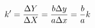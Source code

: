 \documentclass[preview]{standalone}
\begin{document}
\begin{align*}
\special{dvisvgm:raw <g id='unique000'>}k'=\frac{\Delta Y}{\Delta X}=\frac{b\Delta y}{a\Delta x}=\frac{b}{a}k\special{dvisvgm:raw </g>}
\end{align*}
\end{document}
